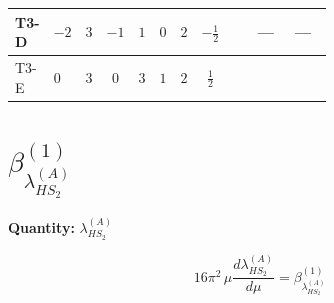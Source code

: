 \documentclass[8pt]{article}
\begin{document}
\begin{landscape}
\begin{longtable}{@{}llcccccc >{\raggedright\arraybackslash}p{0.21\linewidth} >{\raggedright\arraybackslash}p{0.21\linewidth} >{\raggedright\arraybackslash}p{0.21\linewidth}@{}}
\midrule
T3-D & $-2$ & $3$ & $-1$ & $1$ & $0$ & $2$ & $-\frac{1}{2}$ & \scriptsize\adjustbox{max width=\linewidth}{$\begin{gathered} -\frac{33 {g_2}^2 {\lambda_{HS_1}^{(A)}}}{2}\end{gathered}$} & --- & --- \\
\midrule
T3-E & $0$ & $3$ & $0$ & $3$ & $1$ & $2$ & $\frac{1}{2}$ & \scriptsize\adjustbox{max width=\linewidth}{$\begin{gathered} -\frac{33 {g_2}^2 {\lambda_{HS_1}^{(A)}}}{2}\end{gathered}$} & \scriptsize\adjustbox{max width=\linewidth}{$\begin{gathered} -\frac{3 {g_1}^2 {\lambda_{HS_1}^{(A)}}}{2}\end{gathered}$} & \scriptsize\adjustbox{max width=\linewidth}{$\begin{gathered} +12 {\lambda_{12}^{(A)}} {\lambda_{HS_2}^{(A)}}\end{gathered}$} \\
\midrule
\bottomrule
\end{longtable}
\clearpage
\section*{$\beta_{\lambda_{HS_2}^{(A)}}^{(1)}$}
\noindent\textbf{Quantity: }$\lambda_{HS_2}^{(A)}$\par\smallskip
\[16\pi^2\,\mu\frac{d \lambda_{HS_2}^{(A)}}{d\mu}=\beta_{\lambda_{HS_2}^{(A)}}^{(1)}\]

\end{landscape}
\end{document}
